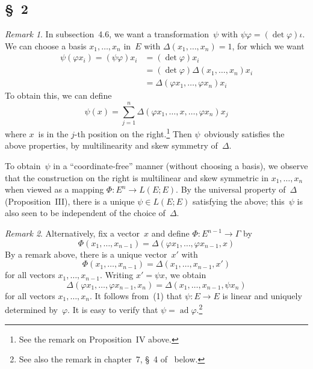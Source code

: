 \documentclass[letterpaper,12pt]{article}
\DeclareMathOperator{\ad}{ad}
\theoremstyle{definition}
\theoremstyle{remark}
\newtheorem*{rmk}{Remark}
\begin{document}
\subsection*{\S~2}
\begin{rmk}
In subsection~4.6, we want a transformation~\(\psi\) with \(\psi\varphi=(\det\varphi)\iota\). We can choose a basis \(x_1,\ldots,x_n\) in~\(E\) with \(\Delta(x_1,\ldots,x_n)=1\), for which we want
\begin{align*}
\psi(\varphi x_i)=(\psi\varphi)x_i&=(\det\varphi)x_i\\
	&=(\det\varphi)\Delta(x_1,\ldots,x_n)x_i\\
	&=\Delta(\varphi x_1,\ldots,\varphi x_n)x_i
\end{align*}
To obtain this, we can define
\[\psi(x)=\sum_{j=1}^n\Delta(\varphi x_1,\ldots,x,\ldots,\varphi x_n)x_j\]
where \(x\)~is in the \(j\)-th position on the right.\footnote{See the remark on Proposition~IV above.} Then \(\psi\)~obviously satisfies the above properties, by multilinearity and skew symmetry of~\(\Delta\).

To obtain~\(\psi\) in a ``coordinate-free''  manner (without choosing a basis), we observe that the construction on the right is multilinear and skew symmetric in \(x_1,\ldots,x_n\) when viewed as a mapping \(\Phi:E^n\to L(E;E)\). By the universal property of~\(\Delta\) (Proposition~III), there is a unique \(\psi\in L(E;E)\) satisfying the above; this~\(\psi\) is also seen to be independent of the choice of~\(\Delta\).
\end{rmk}

\begin{rmk}
Alternatively, fix a vector~\(x\) and define \(\Phi:E^{n-1}\to\Gamma\) by
\[\Phi(x_1,\ldots,x_{n-1})=\Delta(\varphi x_1,\ldots,\varphi x_{n-1},x)\]
By a remark above, there is a unique vector~\(x'\) with
\[\Phi(x_1,\ldots,x_{n-1})=\Delta(x_1,\ldots,x_{n-1},x')\]
for all vectors \(x_1,\ldots,x_{n-1}\). Writing \(x'=\psi x\), we obtain
\[\Delta(\varphi x_1,\ldots,\varphi x_{n-1},x_n)=\Delta(x_1,\ldots, x_{n-1},\psi x_n)\tag{1}\]
for all vectors \(x_1,\ldots,x_n\). It follows from~(1) that \(\psi:E\to E\) is linear and uniquely determined by~\(\varphi\). It is easy to verify that \(\psi=\ad\varphi\).\footnote{See also the remark in chapter~7, \S~4 of~\cite{greub2} below.}
\end{rmk}
\end{document}
